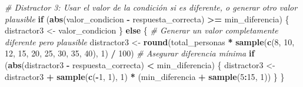 \documentclass[
]{article}
\newenvironment{Shaded}{\begin{snugshade}}{\end{snugshade}}
\newcommand{\CommentTok}[1]{\textcolor[rgb]{0.56,0.35,0.01}{\textit{#1}}}
\newcommand{\ControlFlowTok}[1]{\textcolor[rgb]{0.13,0.29,0.53}{\textbf{#1}}}
\newcommand{\DecValTok}[1]{\textcolor[rgb]{0.00,0.00,0.81}{#1}}
\newcommand{\FunctionTok}[1]{\textcolor[rgb]{0.13,0.29,0.53}{\textbf{#1}}}
\newcommand{\NormalTok}[1]{#1}
\newcommand{\OtherTok}[1]{\textcolor[rgb]{0.56,0.35,0.01}{#1}}
\newcommand{\SpecialCharTok}[1]{\textcolor[rgb]{0.81,0.36,0.00}{\textbf{#1}}}
\begin{document}
\begin{Shaded}
\begin{Highlighting}[]
\CommentTok{\# Distractor 3: Usar el valor de la condición si es diferente, o generar otro valor plausible}
\ControlFlowTok{if}\NormalTok{ (}\FunctionTok{abs}\NormalTok{(valor\_condicion }\SpecialCharTok{{-}}\NormalTok{ respuesta\_correcta) }\SpecialCharTok{\textgreater{}=}\NormalTok{ min\_diferencia) \{}
\NormalTok{  distractor3 }\OtherTok{\textless{}{-}}\NormalTok{ valor\_condicion}
\NormalTok{\} }\ControlFlowTok{else}\NormalTok{ \{}
  \CommentTok{\# Generar un valor completamente diferente pero plausible}
\NormalTok{  distractor3 }\OtherTok{\textless{}{-}} \FunctionTok{round}\NormalTok{(total\_personas }\SpecialCharTok{*} \FunctionTok{sample}\NormalTok{(}\FunctionTok{c}\NormalTok{(}\DecValTok{8}\NormalTok{, }\DecValTok{10}\NormalTok{, }\DecValTok{12}\NormalTok{, }\DecValTok{15}\NormalTok{, }\DecValTok{20}\NormalTok{, }\DecValTok{25}\NormalTok{, }\DecValTok{30}\NormalTok{, }\DecValTok{35}\NormalTok{, }\DecValTok{40}\NormalTok{), }\DecValTok{1}\NormalTok{) }\SpecialCharTok{/} \DecValTok{100}\NormalTok{)}
  \CommentTok{\# Asegurar diferencia mínima}
  \ControlFlowTok{if}\NormalTok{ (}\FunctionTok{abs}\NormalTok{(distractor3 }\SpecialCharTok{{-}}\NormalTok{ respuesta\_correcta) }\SpecialCharTok{\textless{}}\NormalTok{ min\_diferencia) \{}
\NormalTok{    distractor3 }\OtherTok{\textless{}{-}}\NormalTok{ distractor3 }\SpecialCharTok{+} \FunctionTok{sample}\NormalTok{(}\FunctionTok{c}\NormalTok{(}\SpecialCharTok{{-}}\DecValTok{1}\NormalTok{, }\DecValTok{1}\NormalTok{), }\DecValTok{1}\NormalTok{) }\SpecialCharTok{*}\NormalTok{ (min\_diferencia }\SpecialCharTok{+} \FunctionTok{sample}\NormalTok{(}\DecValTok{5}\SpecialCharTok{:}\DecValTok{15}\NormalTok{, }\DecValTok{1}\NormalTok{))}
\NormalTok{  \}}
\NormalTok{\}}


\end{Highlighting}
\end{Shaded}
\end{document}
